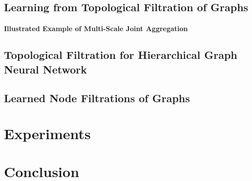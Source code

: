 \documentclass[letterpaper]{article} %
\begin{document}
\subsection{Learning from Topological Filtration of Graphs}

\label{sSec:learning_from_nested_sequences}

\paragraph{Illustrated Example of Multi-Scale Joint Aggregation}


\subsection{Topological Filtration for Hierarchical Graph Neural Network}


\subsection{Learned Node Filtrations of Graphs}

\label{sSec:learned_node_filtration}

\section{Experiments}

\label{Sec:Experiments}

\section{Conclusion}

\label{Sec:Conclusion}

\clearpage


\appendix

\end{document}
